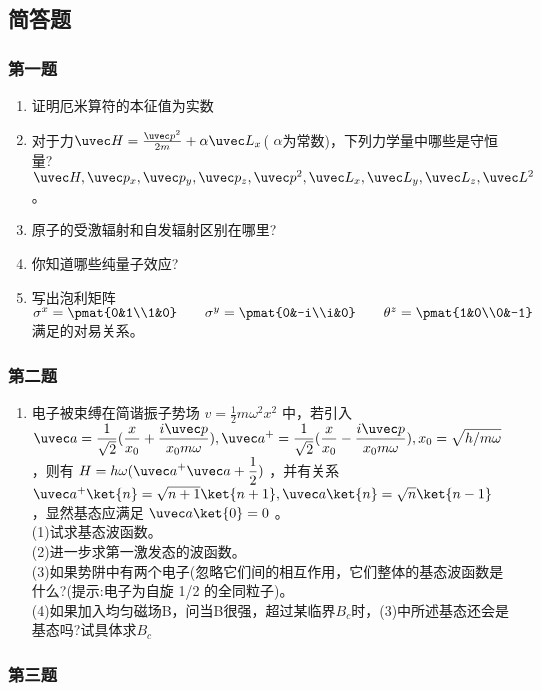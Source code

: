 
\subsection{简答题}
\subsubsection{第一题}
\begin{enumerate}
\item 证明厄米算符的本征值为实数
\item 对于力$\uvec H=\frac{\uvec p^2}{2m}+\alpha \uvec L_x$( $\alpha$为常数)，下列力学量中哪些是守恒量?\\
$\uvec H,\uvec p_x,\uvec p_y,\uvec p_z,\uvec p^2,\uvec L_x,\uvec L_y,\uvec L_z,\uvec L^2$。
\item 原子的受激辐射和自发辐射区别在哪里?
\item 你知道哪些纯量子效应?
\item 写出泡利矩阵
$\sigma^x=\pmat{0&1\\1&0}\qquad \sigma^y=\pmat{0&-i\\i&0}\qquad \theta^z=\pmat{1&0\\0&-1}$满足的对易关系。
\end{enumerate}
\subsubsection{第二题}
\begin{enumerate}
\item 电子被束缚在简谐振子势场 $v=\frac{1}{2}m\omega^2x^2$  中，若引入 $\displaystyle \uvec a =\frac{1}{\sqrt{2}}(\frac{x}{x_0}+\frac{i\uvec p}{x_0m\omega}),\uvec a^+ =\frac{1}{\sqrt{2}}(\frac{x}{x_0}-\frac{i\uvec p}{x_0m\omega}),x_0=\sqrt{h/m\omega}$ ，则有 $\displaystyle H=h\omega(\uvec a^+ \uvec a+\frac{1}{2})$ ，并有关系 $\uvec a^+ \ket{n}=\sqrt{n+1}\ket{n+1},\uvec a \ket{n}=\sqrt{n}\ket{n-1}$ ，显然基态应满足 $\uvec a\ket{0}=0$ 。\\
(1)试求基态波函数。\\
(2)进一步求第一激发态的波函数。\\
(3)如果势阱中有两个电子(忽略它们间的相互作用，它们整体的基态波函数是什么?(提示:电子为自旋 1/2 的全同粒子)。\\
(4)如果加入均匀磁场B，问当B很强，超过某临界$B_c$时，(3)中所述基态还会是基态吗?试具体求$B_c$
\end{enumerate}
\subsubsection{第三题}